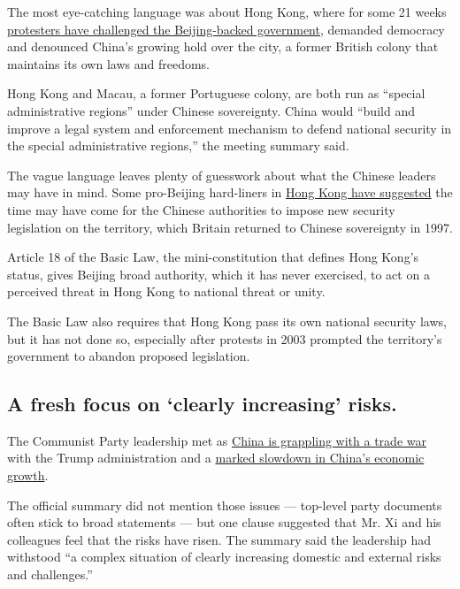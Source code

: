 The most eye-catching language was about Hong Kong, where for some 21
weeks
\href{https://www.nytimes.com/2019/10/31/world/asia/hong-kong-halloween.html}{protesters
have challenged the Beijing-backed government}, demanded democracy and
denounced China's growing hold over the city, a former British colony
that maintains its own laws and freedoms.

Hong Kong and Macau, a former Portuguese colony, are both run as
``special administrative regions'' under Chinese sovereignty. China
would ``build and improve a legal system and enforcement mechanism to
defend national security in the special administrative regions,'' the
meeting summary said.

The vague language leaves plenty of guesswork about what the Chinese
leaders may have in mind. Some pro-Beijing hard-liners in
\href{https://www.nytimes.com/2019/10/06/world/asia/hong-kong-protests-face-mask-ban.html}{Hong
Kong have suggested} the time may have come for the Chinese authorities
to impose new security legislation on the territory, which Britain
returned to Chinese sovereignty in 1997.

Article 18 of the Basic Law, the mini-constitution that defines Hong
Kong's status, gives Beijing broad authority, which it has never
exercised, to act on a perceived threat in Hong Kong to national threat
or unity.

The Basic Law also requires that Hong Kong pass its own national
security laws, but it has not done so, especially after protests in 2003
prompted the territory's government to abandon proposed legislation.

\hypertarget{a-fresh-focus-on-clearly-increasing-risks}{%
\subsection{A fresh focus on `clearly increasing'
risks.}\label{a-fresh-focus-on-clearly-increasing-risks}}

The Communist Party leadership met as
\href{https://www.nytimes.com/2019/10/30/us/politics/us-china-trade-deal.html}{China
is grappling with a trade war} with the Trump administration and a
\href{https://www.nytimes.com/2019/10/17/business/china-economic-growth.html}{marked
slowdown in China's economic growth}.

The official summary did not mention those issues --- top-level party
documents often stick to broad statements --- but one clause suggested
that Mr. Xi and his colleagues feel that the risks have risen. The
summary said the leadership had withstood ``a complex situation of
clearly increasing domestic and external risks and challenges.''

